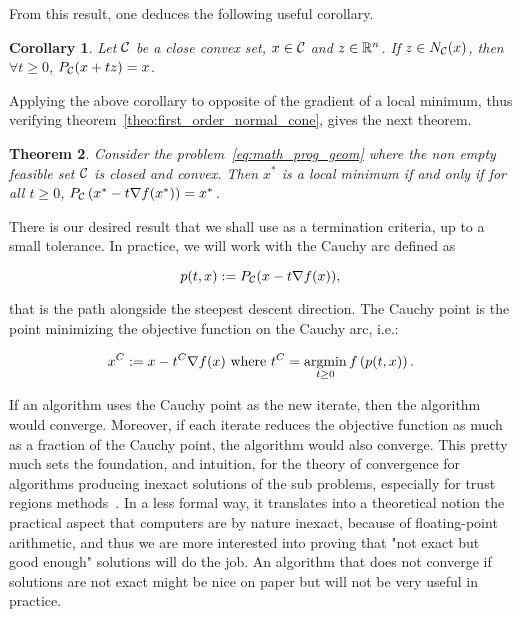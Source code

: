 \documentclass[10pt]{article}
\newtheorem{theorem}{Theorem}[]
\newtheorem{corollary}[theorem]{Corollary}
\numberwithin{equation}{section}
\begin{document}
	From this result, one deduces the following useful corollary.
	
	\begin{corollary}
		Let ${\mathcal{C}}$ be a close convex set, $x \in {\mathcal{C}}$ and $z \in {\mathbb{R}}^n$. If $z \in N_{\mathcal{C}}(x)$, then $\forall t\ge 0$, $P_{\mathcal{C}}(x+tz)=x$.
	\end{corollary}
	
	Applying the above corollary to opposite of the gradient of a local minimum, thus verifying theorem~\ref{theo:first_order_normal_cone}, gives the next theorem.
	
	\begin{theorem}
	Consider the problem~\eqref{eq:math_prog_geom} where the non empty feasible set ${\mathcal{C}}$ is closed and convex. Then $x^*$ is a local minimum if and only if for all $t \ge 0$, $P_{\mathcal{C}}\left(x^*-t\nabla f(x^*)\right)=x^*$.
	\end{theorem}
	
	There is our desired result that we shall use as a termination criteria, up to a small tolerance. In practice, we will work with the Cauchy arc defined as
	
	\begin{equation}\label{eq:cauchy_arc}
		p(t,x) := P_{\mathcal{C}}(x-t\nabla f(x)),
	\end{equation}
	
	that is the path alongside the steepest descent direction. The Cauchy point is the point minimizing the objective function on the Cauchy arc, i.e.:
	
	\begin{equation}
		x^C := x - t^C \nabla f(x) \text{ where } t^C = \operatorname*{argmin}_{t \ge 0} f\left(p(t,x)\right).
	\end{equation}
	
	If an algorithm uses the Cauchy point as the new iterate, then the algorithm would converge. Moreover, if each iterate reduces the objective function as much as a fraction of the Cauchy point, the algorithm would also converge. This pretty much sets the foundation, and intuition, for the theory of convergence for algorithms producing inexact solutions of the sub problems, especially for trust regions methods~\cite{conn-etal:2000}. In a less formal way, it translates into a theoretical notion the practical aspect that computers are by nature inexact, because of floating-point arithmetic, and thus we are more interested into proving that "not exact but good enough" solutions will do the job. An algorithm that does not converge if solutions are not exact might be nice on paper but will not be very useful in practice.
	
\end{document}
